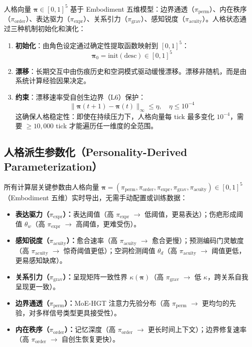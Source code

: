 \documentclass[11pt]{article}
\begin{document}
人格向量 $\boldsymbol{\pi} \in [0,1]^5$ 基于 Embodiment 五维模型：边界通透（$\pi_{\text{perm}}$）、内在秩序（$\pi_{\text{order}}$）、表达驱力（$\pi_{\text{expr}}$）、关系引力（$\pi_{\text{grav}}$）、感知锐度（$\pi_{\text{acuity}}$）。人格状态通过三种机制初始化和演化：

\begin{enumerate}[label=(\alph*)]
\item \textbf{初始化}：由角色设定通过确定性提取函数映射到 $[0,1]^5$：
\begin{equation}
\boldsymbol{\pi}_0 = \text{init}(\text{desc}) \in [0,1]^5
\end{equation}

\item \textbf{漂移}：长期交互中由伤痕历史和空洞模式驱动缓慢漂移。漂移非随机，而是由系统计算经验因果决定。

\item \textbf{约束}：漂移速率受自创生边界（L6）保护：
\begin{equation}
\|\boldsymbol{\pi}(t+1) - \boldsymbol{\pi}(t)\|_\infty \leq \eta, \quad \eta \leq 10^{-4}
\end{equation}
这确保人格稳定性：即使在持续压力下，人格向量每 tick 最多变化 $10^{-4}$，需要 $\geq 10{,}000$ tick 才能遍历任一维度的全范围。
\end{enumerate}

\subsection{人格派生参数化（Personality-Derived Parameterization）}
\label{subsec:personality-parameterization}

所有计算层关键参数由人格向量 $\boldsymbol{\pi} = (\pi_{\text{perm}}, \pi_{\text{order}}, \pi_{\text{expr}}, \pi_{\text{grav}}, \pi_{\text{acuity}}) \in [0,1]^5$（Embodiment 五维）实时导出，无需手动配置或训练数据：

\begin{itemize}[leftmargin=*]
\item \textbf{表达驱力（$\pi_{\text{expr}}$）：}表达阈值（高 $\pi_{\text{expr}}$ $\to$ 低阈值，更易表达）；伤疤形成阈值 $\theta_w$（高 $\pi_{\text{expr}}$ $\to$ 高阈值，更难受伤）。
\item \textbf{感知锐度（$\pi_{\text{acuity}}$）：}愈合速率（高 $\pi_{\text{acuity}}$ $\to$ 愈合更慢）；预测编码门灵敏度（高 $\pi_{\text{acuity}}$ $\to$ 惊奇阈值更低）；空洞检测阈值 $\theta_d$（高 $\pi_{\text{acuity}}$ $\to$ 阈值更低，更易感知缺席）。
\item \textbf{关系引力（$\pi_{\text{grav}}$）：}呈现矩阵一致性界 $\kappa(\boldsymbol{\pi})$（高 $\pi_{\text{grav}}$ $\to$ 低 $\kappa$，跨关系自我呈现更一致）。
\item \textbf{边界通透（$\pi_{\text{perm}}$）：}MoE-HGT 注意力先验分布（高 $\pi_{\text{perm}}$ $\to$ 更均匀的先验，对多样信号类型更具接受性）。
\item \textbf{内在秩序（$\pi_{\text{order}}$）：}记忆深度（高 $\pi_{\text{order}}$ $\to$ 更长时间上下文）；边界修复速率（高 $\pi_{\text{order}}$ $\to$ 自创生恢复更快）。
\end{itemize}
\end{document}
